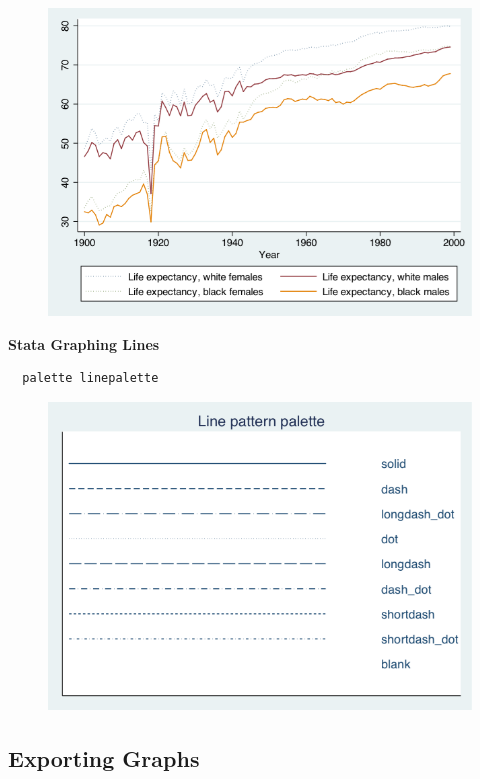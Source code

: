 \documentclass[]{book}
\begin{document}
\begin{figure}
\centering
\includegraphics{Stata/StataModGraph/images/linegraph2.png}
\caption{}
\end{figure}

\textbf{Stata Graphing Lines}

\begin{verbatim}
  palette linepalette
\end{verbatim}

\begin{figure}
\centering
\includegraphics{Stata/StataModGraph/images/linepalette.png}
\caption{}
\end{figure}

\subsection{Exporting Graphs}\label{exporting-graphs}
\end{document}
